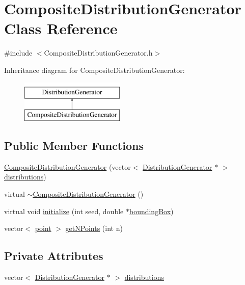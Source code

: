 \hypertarget{class_composite_distribution_generator}{}\section{Composite\+Distribution\+Generator Class Reference}
\label{class_composite_distribution_generator}


{\ttfamily \#include $<$Composite\+Distribution\+Generator.\+h$>$}

Inheritance diagram for Composite\+Distribution\+Generator\+:\begin{figure}[H]
\begin{center}
\leavevmode
\includegraphics[height=2.000000cm]{d0/df2/class_composite_distribution_generator}
\end{center}
\end{figure}
\subsection*{Public Member Functions}
\begin{DoxyCompactItemize}
\item 
\hyperlink{class_composite_distribution_generator_afdeeb68400f21cb63d4f8fe194ed7e7f}{Composite\+Distribution\+Generator} (vector$<$ \hyperlink{class_distribution_generator}{Distribution\+Generator} $\ast$ $>$ \hyperlink{class_composite_distribution_generator_a9f89632c997c30324e4652ea8bc6d761}{distributions})
\item 
virtual \hyperlink{class_composite_distribution_generator_afdb870d99c1a6fee740abdcc9f4e1c8e}{$\sim$\+Composite\+Distribution\+Generator} ()
\item 
virtual void \hyperlink{class_composite_distribution_generator_a799c7a57b895245c81a9492ddff63384}{initialize} (int seed, double $\ast$\hyperlink{class_distribution_generator_abbb670b1d48a4820559097b85bf6ee2d}{bounding\+Box})
\item 
vector$<$ \hyperlink{structpoint}{point} $>$ \hyperlink{class_composite_distribution_generator_ac5aaadd082a0df0bda42cc8768ecc8d2}{get\+N\+Points} (int n)
\end{DoxyCompactItemize}
\subsection*{Private Attributes}
\begin{DoxyCompactItemize}
\item 
vector$<$ \hyperlink{class_distribution_generator}{Distribution\+Generator} $\ast$ $>$ \hyperlink{class_composite_distribution_generator_a9f89632c997c30324e4652ea8bc6d761}{distributions}
\end{DoxyCompactItemize}
